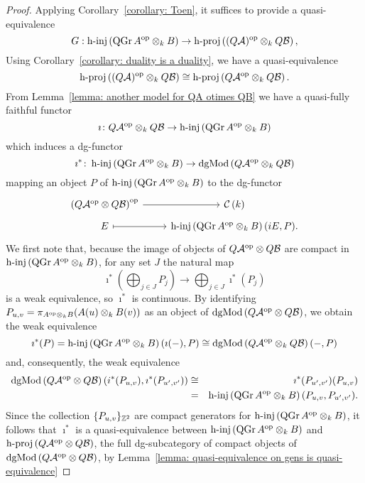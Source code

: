 \begin{proof}
  Applying Corollary~\ref{corollary: Toen}, it suffices to provide a quasi-equivalence
  \begin{displaymath}
    G : \operatorname{h-inj}\left(\operatorname{QGr}A^{\operatorname{op}} \otimes_k B\right) \to \operatorname{h-proj}\left( (Q \mathcal A)^{\operatorname{op}} \otimes_k Q \mathcal B\right),
  \end{displaymath}
  Using Corollary~\ref{corollary: duality is a duality}, we have a quasi-equivalence
  \begin{displaymath}
    \operatorname{h-proj}\left( (Q \mathcal A)^{\operatorname{op}} \otimes_k Q \mathcal B\right) \cong \operatorname{h-proj}\left( Q \mathcal A^{\operatorname{op}} \otimes_k Q \mathcal B\right). 
  \end{displaymath}
  From Lemma~\ref{lemma: another model for QA otimes QB} we have a quasi-fully faithful functor 
  \begin{displaymath}
    \imath \colon Q \mathcal A^{\operatorname{op}} \otimes_k Q \mathcal B \to \operatorname{h-inj}\left(\operatorname{QGr}A^{\operatorname{op}} \otimes_k B\right)
  \end{displaymath}
  which induces a dg-functor
  \begin{displaymath}
    \imath^\ast \colon \operatorname{h-inj}\left(\operatorname{QGr}A^{\operatorname{op}} \otimes_k B\right) \to \operatorname{dgMod}\left(Q \mathcal A^{\operatorname{op}} \otimes_k Q \mathcal B\right)
  \end{displaymath}
  mapping an object \(P\) of \(\operatorname{h-inj}\left(\operatorname{QGr}A^{\operatorname{op}} \otimes_k B\right)\) to the dg-functor
  \[\begin{tikzcd}[row sep=tiny]
  \left(Q\A^\opp \otimes Q\B\right)^\opp \arrow{r} & \CH{k}\\
  E \arrow[mapsto]{r} & \hinj{\QGr{A^\opp \otimes_k B}}(iE, P).
  \end{tikzcd}\]
  We first note that, because the image of objects of \(Q\mathcal{A}^{\operatorname{op}} \otimes Q\mathcal{B}\) are compact in \(\operatorname{h-inj}\left(\operatorname{QGr}A^{\operatorname{op}} \otimes_k B\right)\), for any set \(J\) the natural map
  \[\imath^\ast\left(\bigoplus_{j \in J} P_j\right)\to \bigoplus_{j \in J} \imath^\ast(P_j)\]
    is a weak equivalence, so \(\imath^\ast\) is continuous.
    By identifying \(P_{u,v} = \pi_{A^{\operatorname{op}} \otimes_k B}(A(u) \otimes_k B(v))\) as an object of \(\operatorname{dgMod}\left(Q\mathcal{A}^{\operatorname{op}} \otimes Q\mathcal{B}\right)\), we obtain the weak equivalence
    \[\imath^\ast(P) = \operatorname{h-inj}\left(\operatorname{QGr}A^{\operatorname{op}} \otimes_k B\right)(\imath(-), P) \cong \operatorname{dgMod}\left(Q\mathcal{A}^{\operatorname{op}} \otimes_k Q\mathcal{B}\right)(-, P)\]
    and, consequently, the weak equivalence
    \begin{eqnarray*}
      \operatorname{dgMod}\left(Q\mathcal{A}^{\operatorname{op}} \otimes Q\mathcal{B}\right)(i^\ast(P_{u,v}), \imath^\ast(P_{u^\prime, v^\prime}))
      &\cong& \imath^\ast(P_{u^\prime, v^\prime})(P_{u,v}) \\
      &=& \operatorname{h-inj}\left(\operatorname{QGr}A^{\operatorname{op}} \otimes_k B\right)(P_{u,v}, P_{u^\prime, v^\prime}).
    \end{eqnarray*}
    Since the collection \(\{P_{u,v}\}_{\mathbb{Z}^2}\) are compact generators for \(\operatorname{h-inj}\left(\operatorname{QGr}A^{\operatorname{op}} \otimes_k B\right)\), it follows that \(\imath^\ast\) is a quasi-equivalence between \(\operatorname{h-inj}\left(\operatorname{QGr}A^{\operatorname{op}} \otimes_k B\right)\) and \(\operatorname{h-proj}\left(Q\mathcal{A}^{\operatorname{op}} \otimes Q\mathcal{B}\right)\), the full dg-subcategory of compact objects of \(\operatorname{dgMod}\left(Q\mathcal{A}^{\operatorname{op}} \otimes Q\mathcal{B}\right)\), by Lemma~\ref{lemma: quasi-equivalence on gens is quasi-equivalence}


\end{proof}
